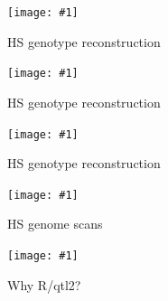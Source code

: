 \documentclass[12pt]{article}
\newcommand{\headsize}{\fontsize{35}{35} \selectfont}
\newcommand{\smallsize}{\fontsize{25}{30} \selectfont}
\newcommand{\figh}[2]{\centerline{\texttt{[image: \#1]}}}
\begin{document}
\figh{Figs/genoprobsC.pdf}{0.9}


\newpage

\headsize \color{myyellow}
\hfill\begin{minipage}{6.75in}
\centering
HS genotype reconstruction
\end{minipage}

\vspace{5mm}

\figh{Figs/genoprobsD.pdf}{0.9}


\newpage

\headsize \color{myyellow}
\hfill\begin{minipage}{6.75in}
\centering
HS genotype reconstruction
\end{minipage}

\vspace{5mm}

\figh{Figs/genoprobsE.pdf}{0.9}


\newpage

\headsize \color{myyellow}
\hfill\begin{minipage}{6.75in}
\centering
HS genotype reconstruction
\end{minipage}

\vspace{5mm}

\figh{Figs/genoprobsF.pdf}{0.9}


\newpage

\headsize \color{myyellow}
\hfill\begin{minipage}{6.75in}
\centering
HS genome scans
\end{minipage}

\vspace{5mm}

\figh{Figs/do_scan.png}{0.9}



\newpage

\headsize \color{myyellow}
\hfill \begin{minipage}{5.75in}
\centering
Why R/qtl2?
\end{minipage}

\vspace{3cm}

\color{mywhite} \smallsize
\end{document}
